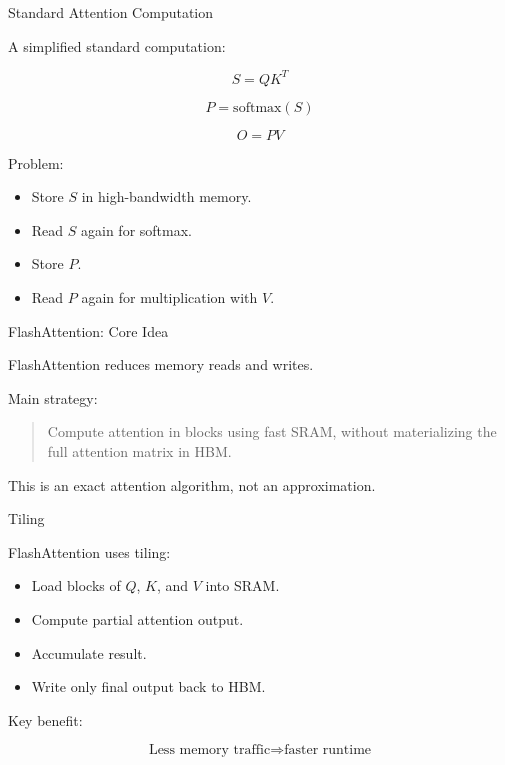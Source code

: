 \documentclass[aspectratio=169]{beamer}
\begin{document}
\begin{frame}{Standard Attention Computation}

A simplified standard computation:

\[
S = QK^T
\]

\[
P = \mathrm{softmax}(S)
\]

\[
O = PV
\]

\vspace{0.5cm}

Problem:

\begin{itemize}
    \item Store $S$ in high-bandwidth memory.
    \item Read $S$ again for softmax.
    \item Store $P$.
    \item Read $P$ again for multiplication with $V$.
\end{itemize}

\end{frame}

\begin{frame}{FlashAttention: Core Idea}

FlashAttention reduces memory reads and writes.

\vspace{0.5cm}

Main strategy:

\begin{quote}
Compute attention in blocks using fast SRAM, without materializing the full attention matrix in HBM.
\end{quote}

\vspace{0.5cm}

This is an exact attention algorithm, not an approximation.

\end{frame}

\begin{frame}{Tiling}

FlashAttention uses tiling:

\begin{itemize}
    \item Load blocks of $Q$, $K$, and $V$ into SRAM.
    \item Compute partial attention output.
    \item Accumulate result.
    \item Write only final output back to HBM.
\end{itemize}

\vspace{0.5cm}

Key benefit:

\[
\text{Less memory traffic}
\Rightarrow
\text{faster runtime}
\]

\end{frame}
\end{document}
